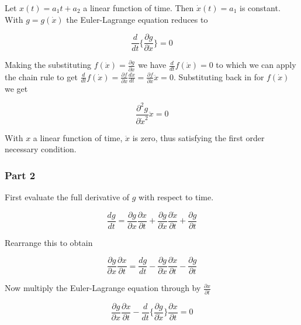 \documentclass[11pt,letterpaper,onecolumn,notitlepage]{article}
\begin{document}
Let $x(t)=a_{1}t+a_{2}$ a linear function of time.
Then $\dot{x}(t)=a_{1}$ is constant.
With $g=g(\dot{x})$ the Euler-Lagrange equation reduces to

\begin{equation*}
  \frac{d}{dt}\biggr\{\frac{\partial{}g}{\partial\dot{x}}\biggr\}=0
\end{equation*}

Making the substituting $f(\dot{x})=\frac{\partial{}g}{\partial\dot{x}}$ we have $\frac{d}{dt}f(\dot{x})=0$ to which we can apply the chain rule to get $\frac{d}{dt}f(\dot{x})=\frac{\partial{}f}{\partial\dot{x}}\frac{d\dot{x}}{dt}=\frac{\partial{}f}{\partial\dot{x}}\ddot{x}=0$.
Substituting back in for $f(\dot{x})$ we get

\begin{equation*}
  \frac{\partial^{2}g}{\partial\dot{x}^{2}}\ddot{x}=0
\end{equation*}

With $x$ a linear function of time, $\ddot{x}$ is zero, thus satisfying the first order necessary condition.

\subsubsection*{Part 2}

First evaluate the full derivative of $g$ with respect to time.

\begin{equation*}
  \frac{dg}{dt}=\frac{\partial{}g}{\partial{}x}\frac{\partial{}x}{\partial{}t}+\frac{\partial{}g}{\partial\dot{x}}\frac{\partial\dot{x}}{\partial{}t}+\frac{\partial{}g}{\partial{}t}
\end{equation*}

Rearrange this to obtain

\begin{equation*}
  \frac{\partial{}g}{\partial{}x}\frac{\partial{}x}{\partial{}t}=
  \frac{dg}{dt}-\frac{\partial{}g}{\partial\dot{x}}\frac{\partial\dot{x}}{\partial{}t}-\frac{\partial{}g}{\partial{}t}
\end{equation*}

Now multiply the Euler-Lagrange equation through by $\frac{\partial{}x}{\partial{}t}$

\begin{equation*}
  \frac{\partial{}g}{\partial{}x}\frac{\partial{}x}{\partial{}t}-\frac{d}{dt}\biggr\{\frac{\partial{}g}{\partial\dot{x}}\biggr\}\frac{\partial{}x}{\partial{}t}=0
\end{equation*}
\end{document}
